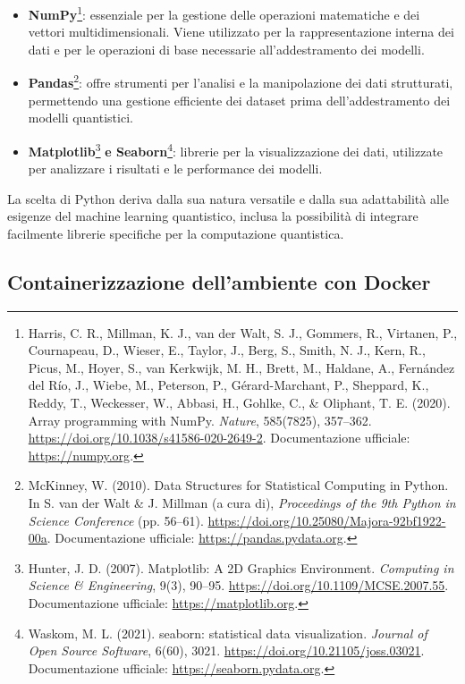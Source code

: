 \begin{itemize}
    \item \textbf{NumPy}\footnote{Harris, C. R., Millman, K. J., van der Walt, S. J., Gommers, R., Virtanen, P., Cournapeau, D., Wieser, E., Taylor, J., Berg, S., Smith, N. J., Kern, R., Picus, M., Hoyer, S., van Kerkwijk, M. H., Brett, M., Haldane, A., Fernández del Río, J., Wiebe, M., Peterson, P., Gérard-Marchant, P., Sheppard, K., Reddy, T., Weckesser, W., Abbasi, H., Gohlke, C., \& Oliphant, T. E. (2020). Array programming with NumPy. \textit{Nature}, 585(7825), 357--362. \url{https://doi.org/10.1038/s41586-020-2649-2}. Documentazione ufficiale: \url{https://numpy.org}.}: essenziale per la gestione delle operazioni matematiche e dei vettori multidimensionali. Viene utilizzato per la rappresentazione interna dei dati e per le operazioni di base necessarie all'addestramento dei modelli.
    \item \textbf{Pandas}\footnote{McKinney, W. (2010). Data Structures for Statistical Computing in Python. In S. van der Walt \& J. Millman (a cura di), \textit{Proceedings of the 9th Python in Science Conference} (pp. 56--61). \url{https://doi.org/10.25080/Majora-92bf1922-00a}. Documentazione ufficiale: \url{https://pandas.pydata.org}.}: offre strumenti per l'analisi e la manipolazione dei dati strutturati, permettendo una gestione efficiente dei dataset prima dell'addestramento dei modelli quantistici.
    \item \textbf{Matplotlib}\footnote{Hunter, J. D. (2007). Matplotlib: A 2D Graphics Environment. \textit{Computing in Science \& Engineering}, 9(3), 90--95. \url{https://doi.org/10.1109/MCSE.2007.55}. Documentazione ufficiale: \url{https://matplotlib.org}.} \textbf{e Seaborn}\footnote{Waskom, M. L. (2021). seaborn: statistical data visualization. \textit{Journal of Open Source Software}, 6(60), 3021. \url{https://doi.org/10.21105/joss.03021}. Documentazione ufficiale: \url{https://seaborn.pydata.org}.}: librerie per la visualizzazione dei dati, utilizzate per analizzare i risultati e le performance dei modelli.
\end{itemize}

La scelta di Python deriva dalla sua natura versatile e dalla sua adattabilità alle esigenze del machine learning quantistico, inclusa la possibilità di integrare facilmente librerie specifiche per la computazione quantistica.

\subsection{Containerizzazione dell'ambiente con Docker}
\label{sec:docker}

